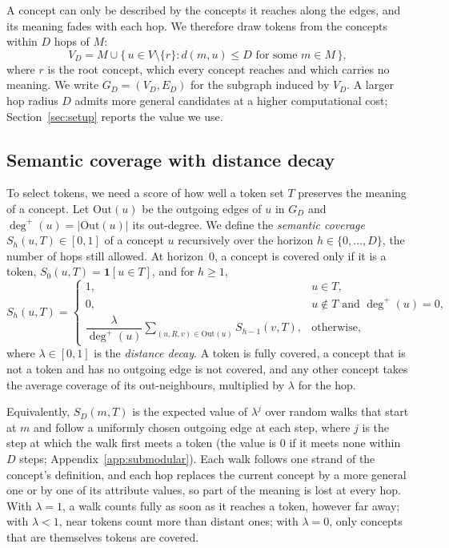 A concept can only be described by the concepts it reaches along the edges, and its meaning fades with each hop.
We therefore draw tokens from the concepts within $D$ hops of $M$:
\[
V_D = M \cup \{\, u \in V \setminus \{r\} : d(m, u) \le D \text{ for some } m \in M \,\},
\]
where $r$ is the root concept, which every concept reaches and which carries no meaning.
We write $G_D = (V_D, E_D)$ for the subgraph induced by $V_D$.
A larger hop radius $D$ admits more general candidates at a higher computational cost; Section~\ref{sec:setup} reports the value we use.

\subsection{Semantic coverage with distance decay}
\label{sec:method:score}

To select tokens, we need a score of how well a token set $T$ preserves the meaning of a concept.
Let $\mathrm{Out}(u)$ be the outgoing edges of $u$ in $G_D$ and $\deg^+(u) = |\mathrm{Out}(u)|$ its out-degree.
We define the \emph{semantic coverage} $S_h(u, T) \in [0, 1]$ of a concept $u$ recursively over the horizon $h \in \{0, \dots, D\}$, the number of hops still allowed.
At horizon~0, a concept is covered only if it is a token, $S_0(u, T) = \mathbf{1}[u \in T]$, and for $h \ge 1$,
\begin{equation}
S_h(u, T) =
\begin{cases}
1, & u \in T, \\[2pt]
0, & u \notin T \text{ and } \deg^+(u) = 0, \\[2pt]
\dfrac{\lambda}{\deg^+(u)} \displaystyle\sum_{(u,R,v) \in \mathrm{Out}(u)} S_{h-1}(v, T), & \text{otherwise,}
\end{cases}
\label{eq:coverage}
\end{equation}
where $\lambda \in [0, 1]$ is the \emph{distance decay}.
A token is fully covered, a concept that is not a token and has no outgoing edge is not covered, and any other concept takes the average coverage of its out-neighbours, multiplied by $\lambda$ for the hop.

Equivalently, $S_D(m, T)$ is the expected value of $\lambda^j$ over random walks that start at $m$ and follow a uniformly chosen outgoing edge at each step, where $j$ is the step at which the walk first meets a token (the value is 0 if it meets none within $D$ steps; Appendix~\ref{app:submodular}).
Each walk follows one strand of the concept's definition, and each hop replaces the current concept by a more general one or by one of its attribute values, so part of the meaning is lost at every hop.
With $\lambda = 1$, a walk counts fully as soon as it reaches a token, however far away; with $\lambda < 1$, near tokens count more than distant ones; with $\lambda = 0$, only concepts that are themselves tokens are covered.

